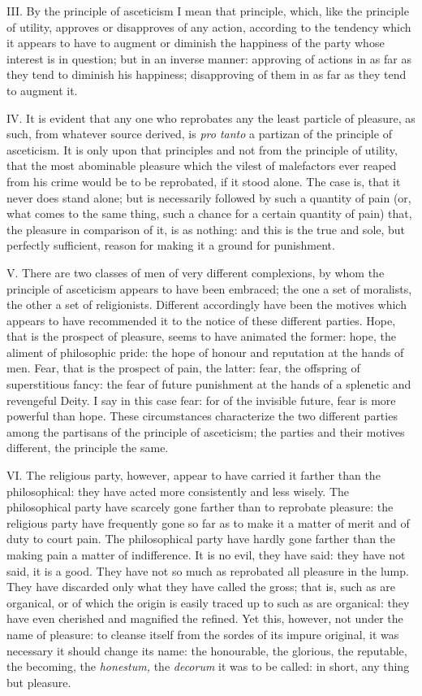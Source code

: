 \documentclass[12pt]{report}
\begin{document}
III. By the principle of asceticism I mean that principle, which, like
the principle of utility, approves or disapproves of any action,
according to the tendency which it appears to have to augment or
diminish the happiness of the party whose interest is in question; but
in an inverse manner: approving of actions in as far as they tend to
diminish his happiness; disapproving of them in as far as they tend to
augment it.

IV. It is evident that any one who reprobates any the least particle of
pleasure, as such, from whatever source derived, is \emph{pro tanto} a
partizan of the principle of asceticism. It is only upon that principles
and not from the principle of utility, that the most abominable pleasure
which the vilest of malefactors ever reaped from his crime would be to
be reprobated, if it stood alone. The case is, that it never does stand
alone; but is necessarily followed by such a quantity of pain (or, what
comes to the same thing, such a chance for a certain quantity of pain)
that, the pleasure in comparison of it, is as nothing: and this is the
true and sole, but perfectly sufficient, reason for making it a ground
for punishment.

V. There are two classes of men of very different complexions, by whom
the principle of asceticism appears to have been embraced; the one a set
of moralists, the other a set of religionists. Different accordingly
have been the motives which appears to have recommended it to the notice
of these different parties. Hope, that is the prospect of pleasure,
seems to have animated the former: hope, the aliment of philosophic
pride: the hope of honour and reputation at the hands of men. Fear, that
is the prospect of pain, the latter: fear, the offspring of
superstitious fancy: the fear of future punishment at the hands of a
splenetic and revengeful Deity. I say in this case fear: for of the
invisible future, fear is more powerful than hope. These circumstances
characterize the two different parties among the partisans of the
principle of asceticism; the parties and their motives different, the
principle the same.

VI. The religious party, however, appear to have carried it farther than
the philosophical: they have acted more consistently and less wisely.
The philosophical party have scarcely gone farther than to reprobate
pleasure: the religious party have frequently gone so far as to make it
a matter of merit and of duty to court pain. The philosophical party
have hardly gone farther than the making pain a matter of indifference.
It is no evil, they have said: they have not said, it is a good. They
have not so much as reprobated all pleasure in the lump. They have
discarded only what they have called the gross; that is, such as are
organical, or of which the origin is easily traced up to such as are
organical: they have even cherished and magnified the refined. Yet this,
however, not under the name of pleasure: to cleanse itself from the
sordes of its impure original, it was necessary it should change its
name: the honourable, the glorious, the reputable, the becoming, the
\emph{honestum,} the \emph{decorum} it was to be called: in short, any
thing but pleasure.
\end{document}
